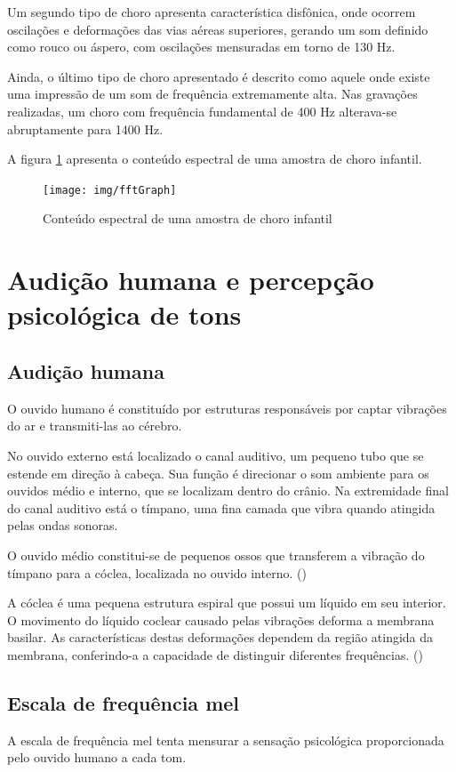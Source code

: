 \documentclass[10pt,a4paper]{article}
\begin{document}
\begin{multicols*}{2}
Um segundo tipo de choro apresenta característica disfônica, onde ocorrem oscilações e deformações das vias aéreas superiores, gerando um som definido como rouco ou áspero, com oscilações mensuradas em torno de 130 Hz.

Ainda, o último tipo de choro apresentado é descrito como aquele onde existe uma impressão de um som de frequência extremamente alta. Nas gravações realizadas, um choro com frequência fundamental de 400 Hz alterava-se abruptamente para 1400 Hz.

A figura \ref{fig:fftchoro} apresenta o conteúdo espectral de uma amostra de choro infantil.

\begin{figure}[H]
\centering
\texttt{[image: img/fftGraph]}
\caption{Conteúdo espectral de uma amostra de choro infantil}
\label{fig:fftchoro}
\end{figure}
		
\section{Audição humana e percepção psicológica de tons}
\subsection{Audição humana}

O ouvido humano é constituído por estruturas responsáveis por captar vibrações do ar e transmiti-las ao cérebro. 

No ouvido externo está localizado o canal auditivo, um pequeno tubo que se estende em direção à cabeça. Sua função é direcionar o som ambiente para os ouvidos médio e interno, que se localizam dentro do crânio. Na extremidade final do canal auditivo está o tímpano, uma fina camada que vibra quando atingida pelas ondas sonoras.

O ouvido médio constitui-se de pequenos ossos que transferem a vibração do tímpano para a cóclea, localizada no ouvido interno. (\cite{smith1999dsp})

A cóclea é uma pequena estrutura espiral que possui um líquido em seu interior. O movimento do líquido coclear causado pelas vibrações deforma a membrana basilar. As características destas deformações dependem da região atingida da membrana, conferindo-a a capacidade de distinguir diferentes frequências. (\cite{purves2001neuroscience})

\subsection{Escala de frequência mel}
A escala de frequência mel tenta mensurar a sensação psicológica proporcionada pelo ouvido humano a cada tom. 


\end{multicols*}
\end{document}
